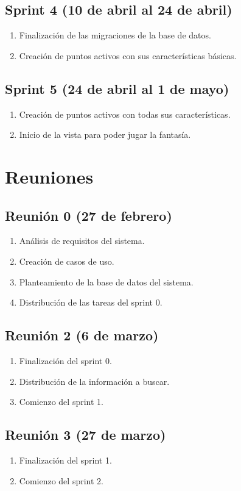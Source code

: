 \subsection{Sprint 4 (10 de abril al 24 de abril)}
\begin{enumerate}
	\item Finalización de las migraciones de la base de datos.
	\item Creación de puntos activos con sus características básicas.
\end{enumerate}

\subsection{Sprint 5 (24 de abril al 1 de mayo)}
\begin{enumerate}
	\item Creación de puntos activos con todas sus características.
	\item Inicio de la vista para poder jugar la fantasía.
\end{enumerate}


\section{Reuniones}
\subsection{Reunión 0 (27 de febrero)}
\begin{enumerate}
	\item Análisis de requisitos del sistema.
	\item Creación de casos de uso.
	\item Planteamiento de la base de datos del sistema.
	\item Distribución de las tareas del sprint 0.
\end{enumerate}

\subsection{Reunión 2 (6 de marzo)}
\begin{enumerate}
	\item Finalización del sprint 0.
	\item Distribución de la información a buscar.
	\item Comienzo del sprint 1.
\end{enumerate}

\subsection{Reunión 3 (27 de marzo)}
\begin{enumerate}
	\item Finalización del sprint 1.
	\item Comienzo del sprint 2.
\end{enumerate}

